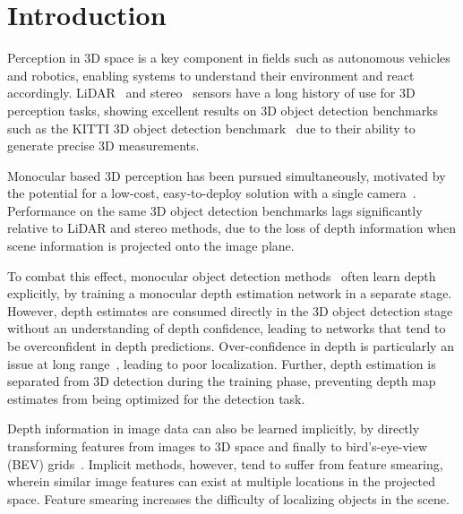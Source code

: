 \documentclass[final]{cvpr}
\begin{document}
\section{Introduction} \label{sec:Introduction}
Perception in 3D space is a key component in fields such as autonomous vehicles and robotics, enabling systems to understand their environment and react accordingly. LiDAR~\cite{AVOD, PV-RCNN, PointRCNN} and stereo~\cite{e2e_pseudo-lidar, OCStereo, CGStereo, DSGN} sensors have a long history of use for 3D perception tasks, showing excellent results on 3D object detection benchmarks such as the KITTI 3D object detection benchmark~\cite{Kitti} due to their ability to generate precise 3D measurements.

Monocular based 3D perception has been pursued simultaneously, motivated by the potential for a low-cost, easy-to-deploy solution with a single camera~\cite{Mono3D, Deep3DBox, DeepMANTA, monopsr}.  Performance on the same 3D object detection benchmarks lags significantly relative to LiDAR and stereo methods, due to the loss of depth information when scene information is projected onto the image plane.

To combat this effect, monocular object detection methods~\cite{D4LCN, PatchNet, AM3D, Psuedo-LIDAR} often learn depth explicitly, by training a monocular depth estimation network in a separate stage. However, depth estimates are consumed directly in the 3D object detection stage without an understanding of depth confidence, leading to networks that tend to be overconfident in depth predictions. Over-confidence in depth is particularly an issue at long range~\cite{Psuedo-LIDAR}, leading to poor localization. Further, depth estimation is separated from 3D detection during the training phase, preventing depth map estimates from being optimized for the detection task.

Depth information in image data can also be learned implicitly, by directly transforming features from images to 3D space and finally to bird's-eye-view (BEV) grids~\cite{OFT, LiftSplatShoot}. Implicit methods, however, tend to suffer from feature smearing, wherein similar image features can exist at multiple locations in the projected space. Feature smearing increases the difficulty of localizing objects in the scene.
\end{document}
